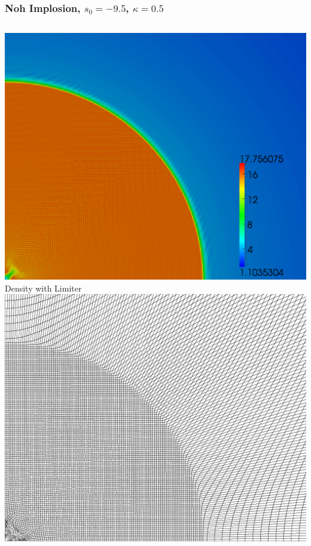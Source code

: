 \documentclass[8pt,xcolor=svgnames]{beamer}
\begin{document}
\begin{frame}\frametitle{Noh Implosion, $s_0=-9.5$, $\kappa=0.5$}
\begin{columns}
\begin{column}{0.35\textwidth}
\begin{center}
\includegraphics[height=0.9\textwidth]{figs/Noh/Q2l-7-density.png}
\\Density with Limiter
\includegraphics[height=0.9\textwidth]{figs/Noh/Q2l-7-mesh.png}

\end{center}
\end{column}
\end{columns}
\end{frame}
\end{document}
